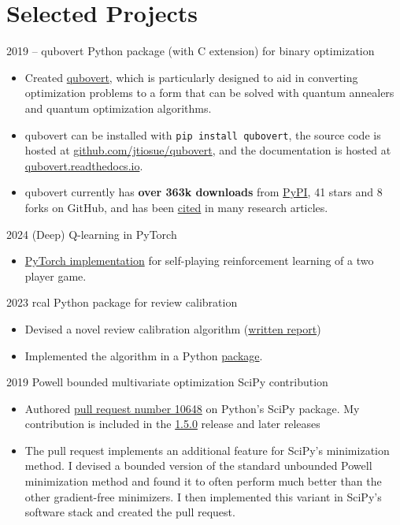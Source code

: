 \section{Selected Projects}


\cventry
  {2019 --}
  {qubovert}
  {Python package (with C extension) for binary optimization}
  {}
  {}
  {
    \begin{itemize}
        \item Created \href{https://github.com/jtiosue/qubovert}{qubovert}, which is particularly designed to aid in converting optimization problems to a form that can be solved with quantum annealers and quantum optimization algorithms.
        \item qubovert can be installed with \texttt{pip install qubovert}, the source code is hosted at \url{github.com/jtiosue/qubovert}, and the documentation is hosted at \url{qubovert.readthedocs.io}.
        \item qubovert currently has \textbf{over 363k downloads} from \href{https://pypi.org/project/qubovert/}{PyPI}, 41 stars and 8 forks on GitHub, and has been \href{https://scholar.google.com/scholar?hl=en&as\_sdt=0\%2C33&q=qubovert&btnG=}{cited} in many research articles.
    \end{itemize}
  }


\cventry
  {2024}
  {(Deep) Q-learning in PyTorch}
  {}
  {}
  {}
  {
  \begin{itemize}
      \item \href{https://github.com/jtiosue/DotsBoxesQLearn}{PyTorch implementation} for self-playing reinforcement learning of a two player game.
  \end{itemize}
  }


\cventry
  {2023}
  {rcal}
  {Python package for review calibration}
  {}
  {}
  {
    \begin{itemize}
      \item Devised a novel review calibration algorithm (\href{https://github.com/jtiosue/rcal/blob/main/report/review_calibration.pdf}{written report})
      \item Implemented the algorithm in a Python \href{https://github.com/jtiosue/rcal}{package}.
    \end{itemize}
  }
    
    
\cventry
  {2019}
  {Powell bounded multivariate optimization}
  {SciPy contribution}
  {}
  {}
  {
    \begin{itemize}
      \item Authored \href{https://github.com/scipy/scipy/pull/10648}{pull request number 10648} on Python’s SciPy package. My contribution is included in the \href{https://github.com/scipy/scipy/releases/tag/v1.5.0}{1.5.0} release and later releases
      \item The pull request implements an additional feature for SciPy’s minimization method. I devised a bounded version of the standard unbounded Powell minimization method and found it to often perform much better than the other gradient-free minimizers. I then implemented this variant in SciPy’s software stack and created the pull request.
    \end{itemize}
  }
    
